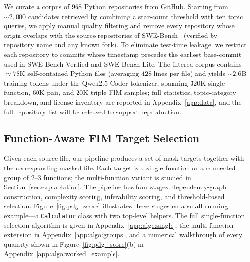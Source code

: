 We curate a corpus of $968$ Python repositories from GitHub. Starting
from $\sim\!2{,}000$ candidates retrieved by combining a star-count
threshold with ten topic queries, we apply manual quality filtering and
remove every repository whose origin overlaps with the source
repositories of SWE-Bench~\citep{swebench} (verified by repository name
and any known fork). To eliminate test-time leakage, we restrict each
repository to commits whose timestamp precedes the earliest base-commit
used in SWE-Bench-Verified and SWE-Bench-Lite. The filtered corpus
contains $\approx\!78\mathrm{K}$ self-contained Python files (averaging
$428$ lines per file) and yields $\sim\!2.6\mathrm{B}$ training tokens
under the Qwen2.5-Coder tokenizer, spanning $320\mathrm{K}$
single-function, $60\mathrm{K}$ pair, and $20\mathrm{K}$ triple FIM
samples; full statistics, topic-category breakdown, and license
inventory are reported in Appendix~\ref{app:data}, and the full
repository list will be released to support reproduction.

\vspace{-0.5ex}
\subsection{Function-Aware FIM Target Selection}
\label{sec:method:selection}

Given each source file, our pipeline produces a set of mask targets
together with the corresponding masked file. Each target is a single
function or a connected group of $2$--$3$ functions; the multi-function
variant is studied in Section~\ref{sec:exp:ablation}. The pipeline has
four stages: dependency-graph construction, complexity scoring,
inferability scoring, and threshold-based selection. Figure~\ref{fig:pdg_score}
illustrates these stages on a small running example---a
\texttt{Calculator} class with two top-level helpers. The full
single-function selection algorithm is given in
Appendix~\ref{app:algo:single}, the multi-function extension in
Appendix~\ref{app:algo:groups}, and a numerical walkthrough of every
quantity shown in Figure~\ref{fig:pdg_score}(b) in
Appendix~\ref{app:algo:worked_example}.

